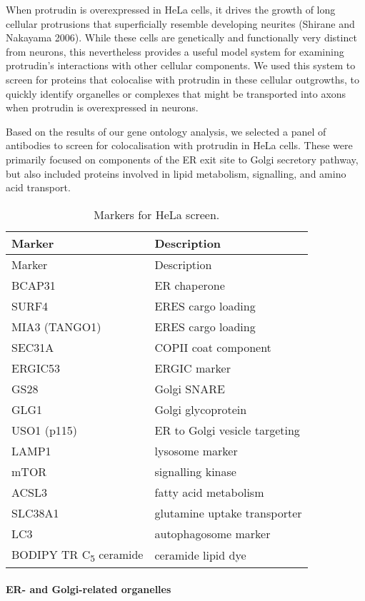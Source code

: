 \documentclass[
]{article}
\begin{document}
When protrudin is overexpressed in HeLa cells, it drives the growth of
long cellular protrusions that superficially resemble developing
neurites (Shirane and Nakayama 2006). While these cells are genetically
and functionally very distinct from neurons, this nevertheless provides
a useful model system for examining protrudin's interactions with other
cellular components. We used this system to screen for proteins that
colocalise with protrudin in these cellular outgrowths, to quickly
identify organelles or complexes that might be transported into axons
when protrudin is overexpressed in neurons.

Based on the results of our gene ontology analysis, we selected a panel
of antibodies to screen for colocalisation with protrudin in HeLa cells.
These were primarily focused on components of the ER exit site to Golgi
secretory pathway, but also included proteins involved in lipid
metabolism, signalling, and amino acid transport.

\begin{longtable}[]{@{}ll@{}}
\caption{Markers for HeLa screen.}\tabularnewline
\toprule()
Marker & Description \\
\midrule()
\endfirsthead
\toprule()
Marker & Description \\
\midrule()
\endhead
BCAP31 & ER chaperone \\
SURF4 & ERES cargo loading \\
MIA3 (TANGO1) & ERES cargo loading \\
SEC31A & COPII coat component \\
ERGIC53 & ERGIC marker \\
GS28 & Golgi SNARE \\
GLG1 & Golgi glycoprotein \\
USO1 (p115) & ER to Golgi vesicle targeting \\
LAMP1 & lysosome marker \\
mTOR & signalling kinase \\
ACSL3 & fatty acid metabolism \\
SLC38A1 & glutamine uptake transporter \\
LC3 & autophagosome marker \\
BODIPY TR C\textsubscript{5} ceramide & ceramide lipid dye \\
\bottomrule()
\end{longtable}

\hypertarget{er--and-golgi-related-organelles}{%
\paragraph{ER- and Golgi-related
organelles}\label{er--and-golgi-related-organelles}}
\end{document}

